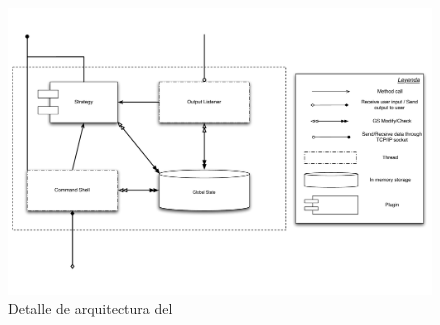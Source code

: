 \subsection{\fend}

\begin{figure}[h!]
\includegraphics[scale=0.4]{graphs/frontend architecture}
\caption{Detalle de arquitectura del \fend}
\label{fig:frontend}
\end{figure}


